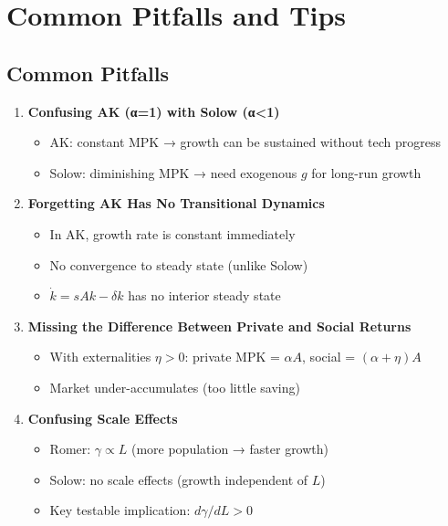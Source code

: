 \section{Common Pitfalls and Tips}

\subsection*{Common Pitfalls}

\begin{enumerate}
    \item \textbf{Confusing AK (α=1) with Solow (α<1)}
    \begin{itemize}
        \item AK: constant MPK → growth can be sustained without tech progress
        \item Solow: diminishing MPK → need exogenous $g$ for long-run growth
    \end{itemize}

    \item \textbf{Forgetting AK Has No Transitional Dynamics}
    \begin{itemize}
        \item In AK, growth rate is constant immediately
        \item No convergence to steady state (unlike Solow)
        \item $\dot{k} = sAk - \delta k$ has no interior steady state
    \end{itemize}

    \item \textbf{Missing the Difference Between Private and Social Returns}
    \begin{itemize}
        \item With externalities $\eta > 0$: private MPK = $\alpha A$, social = $(\alpha+\eta)A$
        \item Market under-accumulates (too little saving)
    \end{itemize}

    \item \textbf{Confusing Scale Effects}
    \begin{itemize}
        \item Romer: $\gamma \propto L$ (more population → faster growth)
        \item Solow: no scale effects (growth independent of $L$)
        \item Key testable implication: $d\gamma/dL > 0$
    \end{itemize}


\end{enumerate}
